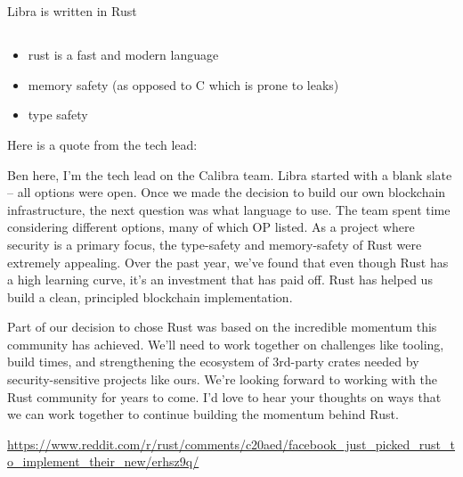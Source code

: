 \documentclass[letterpaper]{article}
\begin{document}
\section{}
\subsection{}
Libra is written in Rust 🦀

\subsection{}
\begin{itemize}
  \item rust is a fast and modern language
  \item memory safety (as opposed to C which is prone to leaks)
  \item type safety
\end{itemize}
Here is a quote from the tech lead:
\begin{displayquote}
  Ben here, I'm the tech lead on the Calibra team. Libra started with a blank slate -- all options were open. Once we made the decision to build our own blockchain infrastructure, the next question was what language to use. The team spent time considering different options, many of which OP listed. As a project where security is a primary focus, the type-safety and memory-safety of Rust were extremely appealing. Over the past year, we've found that even though Rust has a high learning curve, it's an investment that has paid off. Rust has helped us build a clean, principled blockchain implementation.


Part of our decision to chose Rust was based on the incredible momentum this community has achieved. We'll need to work together on challenges like tooling, build times, and strengthening the ecosystem of 3rd-party crates needed by security-sensitive projects like ours. We're looking forward to working with the Rust community for years to come. I'd love to hear your thoughts on ways that we can work together to continue building the momentum behind Rust.
\end{displayquote}

\url{https://www.reddit.com/r/rust/comments/c20aed/facebook_just_picked_rust_to_implement_their_new/erhsz9q/}
\end{document}
